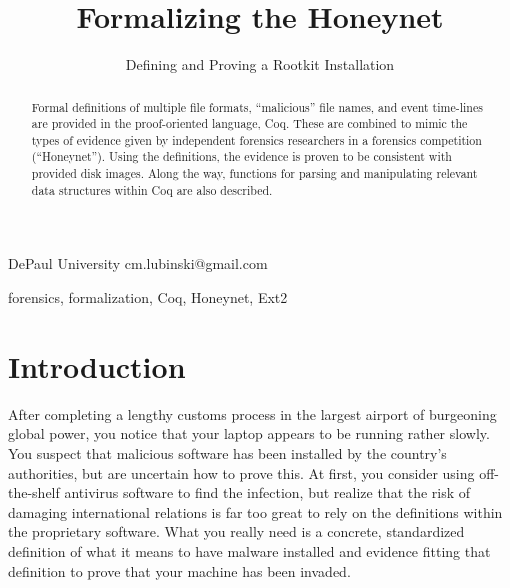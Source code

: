 \documentclass[nocopyrightspace]{sigplanconf}
\begin{document}
\lstset{language=coq, basicstyle=\ttfamily\scriptsize, columns=flexible,
keepspaces=true}

\setlength{\pdfpageheight}{\paperheight}
\setlength{\pdfpagewidth}{\paperwidth}



\title{Formalizing the Honeynet}
\subtitle{Defining and Proving a Rootkit Installation}

           {DePaul University}
           {cm.lubinski@gmail.com}

\maketitle

\begin{abstract}
Formal definitions of multiple file formats, ``malicious'' file names, and
event time-lines are provided in the proof-oriented language, Coq. These are
combined to mimic the types of evidence given by independent forensics
researchers in a forensics competition (``Honeynet''). Using the definitions,
the evidence is proven to be consistent with provided disk images. Along the
way, functions for parsing and manipulating relevant data structures within
Coq are also described.
\end{abstract}

\keywords
forensics, formalization, Coq, Honeynet, Ext2

\section{Introduction}

After completing a lengthy customs process in the largest airport of
burgeoning global power, you notice that your laptop appears to be running
rather slowly. You suspect that malicious software has been installed by the
country's authorities, but are uncertain how to prove this. At first, you
consider using off-the-shelf antivirus software to find the infection, but
realize that the risk of damaging international relations is far too great to
rely on the definitions within the proprietary software. What you really need
is a concrete, standardized definition of what it means to have malware
installed and evidence fitting that definition to prove that your machine has
been invaded.
\end{document}

